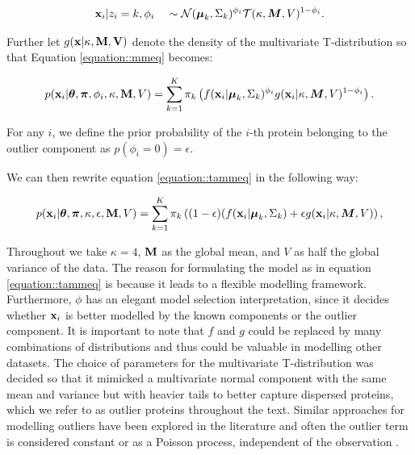 \documentclass[12pt,english]{article}\usepackage[]{graphicx}\usepackage[]{color}
\begin{document}
\begin{align}
{\bf x}_i | z_i = k, \phi_i \quad \sim \mathcal{N}(\boldsymbol{\mu}_k, \Sigma_k)^{\phi_i}\mathcal{T}(\kappa, \boldsymbol{M}, V)^{1 - \phi_i }.
\end{align}

Further let $g({\bf x | \kappa, \bf{M}, V} )$ denote the density of
the multivariate T-distribution so that Equation
\eqref{equation::mmeq} becomes:

\begin{equation} \label{equation::tammeq}
  \begin{split}
    p({\bf x}_i| \boldsymbol{\theta}, \boldsymbol{\pi} ,\phi_i, \kappa, {\bf M}, V) &=  \sum_{k=1}^{K}\pi_k\left(f({\bf x}_i|\boldsymbol{\mu}_k, \Sigma_k)^{\phi_i}g({\bf x}_i|\kappa, \boldsymbol{M}, V)^{1 - \phi_i }\right).\\
  \end{split}
\end{equation}

For any $i$, we define the prior probability of the $i$-th protein
belonging to the outlier component as $p(\phi_i = 0) = \epsilon$.

We can then rewrite equation \eqref{equation::tammeq} in the following way:

\begin{equation}\label{equation::tammepseq}
  \begin{split}
    p({\bf x}_i| \boldsymbol{\theta}, \boldsymbol{\pi} , \kappa, \epsilon, {\bf M}, V) &=  \sum_{k=1}^{K}\pi_k\left((1-\epsilon)(f({\bf x}_i |\boldsymbol{\mu}_k, \Sigma_k) + \epsilon g({\bf x}_i|\kappa, \boldsymbol{M}, V)\right),\\
  \end{split}
\end{equation}

Throughout we take $\kappa = 4$, ${\bf M}$ as the global mean, and $V$
as half the global variance of the data. The reason for formulating
the model as in equation \eqref{equation::tammeq} is because it leads
to a flexible modelling framework. Furthermore, $\phi$ has an elegant
model selection interpretation, since it decides whether ${\bf x}_i$
is better modelled by the known components or the outlier component.
It is important to note that $f$ and $g$ could be replaced by many
combinations of distributions and thus could be valuable in modelling
other datasets. The choice of parameters for the multivariate
T-distribution was decided so that it mimicked a multivariate normal
component with the same mean and variance but with heavier tails to
better capture dispersed proteins, which we refer to as outlier
proteins throughout the text.  Similar approaches for modelling
outliers have been explored in the literature and often the outlier
term is considered constant or as a Poisson process, independent of
the observation \citep{Banfield::1993, Cooke::2011, Coretto::2016,
  Hennig::2004}.
\end{document}
